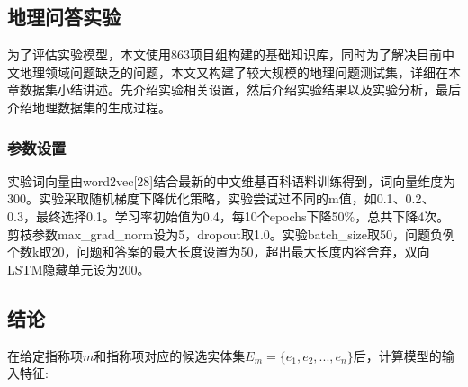 \subsection{地理问答实验}
为了评估实验模型，本文使用863项目组构建的基础知识库，同时为了解决目前中文地理领域问题缺乏的问题，本文又构建了较大规模的地理问题测试集，详细在本章数据集小结讲述。先介绍实验相关设置，然后介绍实验结果以及实验分析，最后介绍地理数据集的生成过程。
\subsubsection{参数设置}
实验词向量由word2vec[28]结合最新的中文维基百科语料训练得到，词向量维度为300。实验采取随机梯度下降优化策略，实验尝试过不同的m值，如0.1、0.2、0.3，最终选择0.1。学习率初始值为0.4，每10个epochs下降50$\%$，总共下降4次。剪枝参数max\_grad\_norm设为5，dropout取1.0。实验batch\_size取50，问题负例个数k取20，问题和答案的最大长度设置为50，超出最大长度内容舍弃，双向LSTM隐藏单元设为200。
\subsection{结论}









在给定指称项$m$和指称项对应的候选实体集$E_m=\{e_1,e_2,...,e_n\}$后，计算模型的输入特征:

